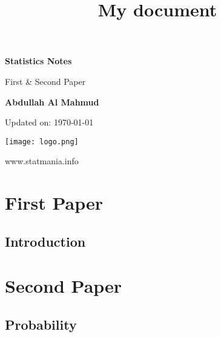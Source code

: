 \documentclass[14pt, a4paper,oneside, margin=1.4in]{book}
\title{My document}
\begin{document}
\frontmatter

\begin{titlepage}
    \begin{center}
        \vspace*{1cm}
            
        \Huge
        \textbf{Statistics Notes}
            
        \vspace{0.5cm}
        \huge
        First \& Second Paper
            
        \vspace{1.5cm}
            
        \textbf{Abdullah Al Mahmud}

     \vspace{1.5cm}

	\Large 
	Updated on: \today
            
        \vfill
            

            
        \vspace{0.8cm}
            
\texttt{[image: logo.png]}
            
        \Large
        www.statmania.info\\
            
    \end{center}
\end{titlepage}


\tableofcontents


\mainmatter
\part {First Paper}

\chapter{Introduction}

\part {Second Paper}
\chapter{Probability} 
\end{document}
